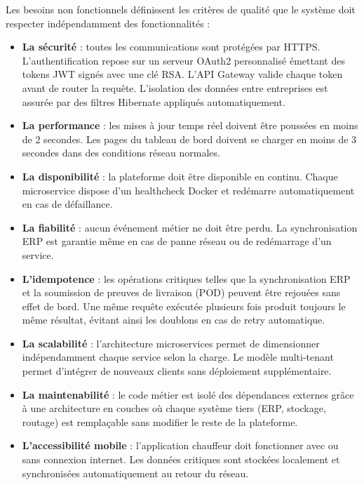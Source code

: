 Les besoins non fonctionnels définissent les critères de qualité que le système doit
respecter indépendamment des fonctionnalités :

\begin{itemize}
  \item \textbf{La sécurité} : toutes les communications sont protégées par HTTPS.
        L'authentification repose sur un serveur OAuth2 personnalisé émettant des tokens
        JWT signés avec une clé RSA. L'API Gateway valide chaque token avant de router
        la requête. L'isolation des données entre entreprises est assurée par des filtres
        Hibernate appliqués automatiquement.

  \item \textbf{La performance} : les mises à jour temps réel doivent être poussées en
        moins de 2 secondes. Les pages du tableau de bord doivent se charger en moins
        de 3 secondes dans des conditions réseau normales.

  \item \textbf{La disponibilité} : la plateforme doit être disponible en continu.
        Chaque microservice dispose d'un healthcheck Docker et redémarre automatiquement
        en cas de défaillance.

  \item \textbf{La fiabilité} : aucun événement métier ne doit être perdu. La
        synchronisation ERP est garantie même en cas de panne réseau ou de redémarrage
        d'un service.

  \item \textbf{L'idempotence} : les opérations critiques telles que la synchronisation
        ERP et la soumission de preuves de livraison (POD) peuvent être rejouées sans
        effet de bord. Une même requête exécutée plusieurs fois produit toujours le
        même résultat, évitant ainsi les doublons en cas de retry automatique.

  \item \textbf{La scalabilité} : l'architecture microservices permet de dimensionner
        indépendamment chaque service selon la charge. Le modèle multi-tenant permet
        d'intégrer de nouveaux clients sans déploiement supplémentaire.

  \item \textbf{La maintenabilité} : le code métier est isolé des dépendances externes
        grâce à une architecture en couches où chaque système tiers (ERP, stockage, routage)
        est remplaçable sans modifier le reste de la plateforme.

  \item \textbf{L'accessibilité mobile} : l'application chauffeur doit fonctionner
        avec ou sans connexion internet. Les données critiques sont stockées localement
        et synchronisées automatiquement au retour du réseau.
\end{itemize}

